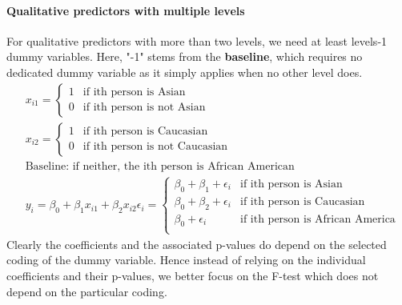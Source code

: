 \documentclass[../document.tex]{subfiles}
\begin{document}
	\paragraph{Qualitative predictors with multiple levels}
	For qualitative predictors with more than two levels, we need at least levels-1 dummy variables. Here, "-1" stems from the \textbf{baseline}, which requires no dedicated dummy variable as it simply applies when no other level does.
	\begin{equation}
	\begin{split}
	&x_{i1}=\begin{cases}
	1 &\text{if ith person is Asian}\\
	0 &\text{if ith person is not Asian}
	\end{cases}\\
	&x_{i2}=\begin{cases}
	1 &\text{if ith person is Caucasian}\\
	0 &\text{if ith person is not Caucasian}
	\end{cases}\\
	&\text{Baseline: if neither, the ith person is African American}\\
	&y_{i} = \beta_{0}+\beta_{1}x_{i1}+\beta_{2}x_{i2}\epsilon_{i}=\begin{cases}
	\beta_{0}+\beta_{1}+\epsilon_{i} &\text{if ith person is Asian}\\
	\beta_{0}+\beta_{2}+\epsilon_{i} &\text{if ith person is Caucasian}\\
	\beta_{0}+\epsilon_{i} &\text{if ith person is African America}\\
	\end{cases}
	\end{split}
	\end{equation}
	Clearly the coefficients and the associated p-values do depend on the selected coding of the dummy variable. Hence instead of relying on the individual coefficients and their p-values, we better focus on the F-test which does not depend on the particular coding.
\end{document}
